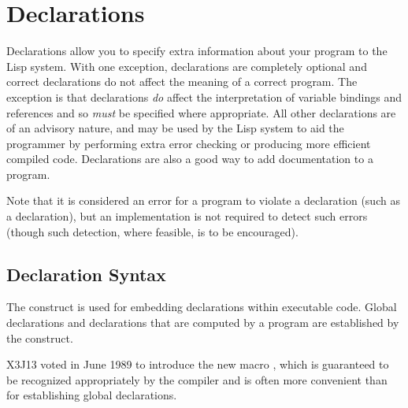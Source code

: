 
\clearpage\def\pagestatus{ULTIMATE}

\ifx \rulang\Undef

\chapter{Declarations}
\label{DECLAR}

Declarations allow you to specify extra information about your program
to the Lisp system.  With one exception,
declarations are completely optional
and correct declarations do not affect the meaning
of a correct program.  The exception is that
 declarations \emph{do} affect the interpretation of variable
bindings and references and so \emph{must} be specified where appropriate.
All other declarations are of an advisory nature, and may be used
by the Lisp system to aid the programmer by performing extra error checking
or producing more efficient compiled code.  Declarations are also
a good way to add documentation to a program.

Note that it is considered an error for a program to violate a
declaration (such as a  declaration), but an implementation is
not required to detect such errors (though such detection, where
feasible, is to be encouraged).

\section{Declaration Syntax}
\label{DECLARE-SYNTAX-SECTION}

The  construct is used for embedding declarations within
executable code.  Global declarations and declarations that are computed
by a program are established by the  construct.

\begin{newer}
X3J13 voted in June 1989 
to introduce the new macro , which is guaranteed
to be recognized appropriately by the compiler and is often more convenient
than  for establishing global declarations.
\end{newer}


